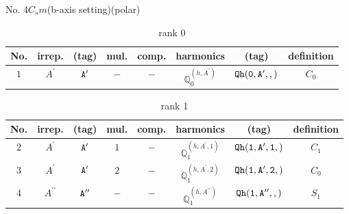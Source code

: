 \documentclass[fleqn,8pt]{jsarticle}
\begin{document}
\setcounter{MaxMatrixCols}{16}

\begin{center}
\LARGE
No. 4\quad$C_{s}$\quad$m$\quad(b-axis setting)\quad[ monoclinic ] (polar)
\end{center}
\begin{table}[ht!]
\begin{center}
\caption{rank 0}
\renewcommand{\arraystretch}{1.3}
\begin{tabular}{cccccccc} \hline \hline
No. & irrep. & (tag) & mul. & comp. & harmonics & (tag) & definition \\ \hline
$ 1 $ & $ A^{\prime} $ & $ {\tt A'} $ & $ - $ & $ - $ & $ \mathbb{Q}_{0}^{(h,A^{\prime})} $ & $ {\tt Qh(0,A',,)} $ & $ C_{0} $ \\
 \hline \hline
\end{tabular}
\end{center}
\end{table}
\begin{table}[ht!]
\begin{center}
\caption{rank 1}
\renewcommand{\arraystretch}{1.3}
\begin{tabular}{cccccccc} \hline \hline
No. & irrep. & (tag) & mul. & comp. & harmonics & (tag) & definition \\ \hline
$ 2 $ & $ A^{\prime} $ & $ {\tt A'} $ & $ 1 $ & $ - $ & $ \mathbb{Q}_{1}^{(h,A^{\prime},1)} $ & $ {\tt Qh(1,A',1,)} $ & $ C_{1} $ \\
$ 3 $ & $ A^{\prime} $ & $ {\tt A'} $ & $ 2 $ & $ - $ & $ \mathbb{Q}_{1}^{(h,A^{\prime},2)} $ & $ {\tt Qh(1,A',2,)} $ & $ C_{0} $ \\
$ 4 $ & $ A^{\prime\prime} $ & $ {\tt A''} $ & $ - $ & $ - $ & $ \mathbb{Q}_{1}^{(h,A^{\prime\prime})} $ & $ {\tt Qh(1,A'',,)} $ & $ S_{1} $ \\
 \hline \hline
\end{tabular}
\end{center}
\end{table}
\end{document}
